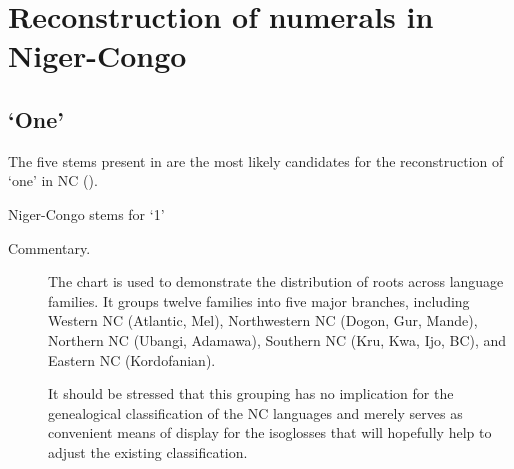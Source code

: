 \chapter{Reconstruction of numerals in Niger-Congo}\label{sec:4}
 
\section{‘One’} 
The five stems present in  are the most likely candidates for the reconstruction of ‘one’ in NC ().




\begin{table}
\caption{\label{tab:4:1}Niger-Congo stems for `1'}
\kppyramid












 
\end{table}
\begin{description}
\item[Commentary.] The chart is used to demonstrate the distribution of roots across language families. It groups twelve families into five major branches, including 
Western NC (Atlantic, Mel),
Northwestern NC (Dogon, Gur, Mande), 
Northern NC (Ubangi, Adamawa),
Southern NC (Kru, Kwa, Ijo, BC), and 
Eastern NC (Kordofanian). 

It should be stressed that this grouping has no implication for the genealogical classification of the NC languages and merely serves as convenient means of display for the isoglosses that will hopefully help to adjust the existing classification.
\end{description}


